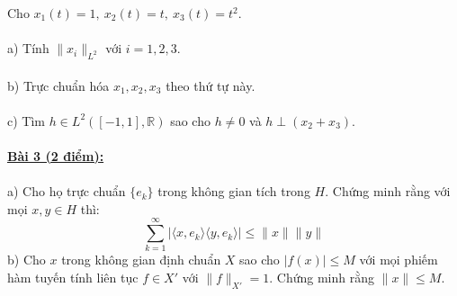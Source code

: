 \documentclass[10pt, a4paper]{article}
\begin{document}
Cho $x_1(t)=1,~x_2(t)=t,~x_3(t)=t^2.$\\\\
\color{red}a) \color{black}Tính $\lVert x_i\rVert_{L^2}$ với $i=1,2,3$.\\\\
\color{red}b) \color{black}Trực chuẩn hóa $x_1,x_2,x_3$ theo thứ tự này.\\\\
\color{red}c) \color{black}Tìm $h\in L^2([-1,1],\mathbb R)$ sao cho $h\ne0$ và $h\perp(x_2+x_3)$.\\\\
\color{red}\underline{\textbf{Bài 3 (2 điểm):}}\\\\ \color{red}a) \color{black}Cho họ trực chuẩn $\{e_k\}$ trong không gian tích trong $H$. Chứng minh rằng với mọi $x,y\in H$ thì: $$\displaystyle\sum_{k=1}^\infty\left|\langle x,e_k\rangle\langle y,e_k\rangle\right|\le\lVert x\rVert\lVert y\rVert$$
\color{red}b) \color{black}Cho $x$ trong không gian định chuẩn $X$ sao cho $|f(x)|\le M$ với mọi phiếm hàm tuyến tính liên tục $f\in X'$ với $\lVert f\rVert_{X'}=1$. Chứng minh rằng $\lVert x\rVert\le M$.

\newpage
\end{document}
